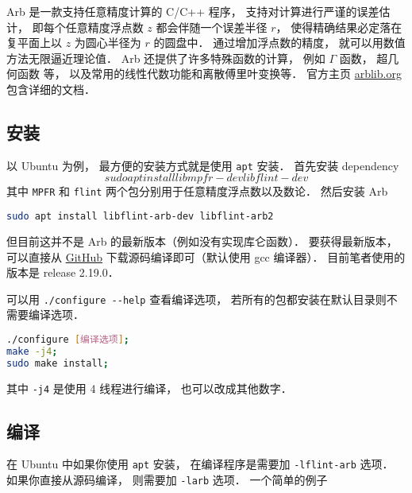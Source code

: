 

Arb 是一款支持任意精度计算的 C/C++ 程序， 支持对计算进行严谨的误差估计， 即每个任意精度浮点数 $z$ 都会伴随一个误差半径 $r$， 使得精确结果必定落在复平面上以 $z$ 为圆心半径为 $r$ 的圆盘中． 通过增加浮点数的精度， 就可以用数值方法无限逼近理论值． Arb 还提供了许多特殊函数的计算， 例如 $\Gamma$ 函数， 超几何函数 等， 以及常用的线性代数功能和离散傅里叶变换等． 官方主页 \href{https://arblib.org/}{arblib.org} 包含详细的文档．

\subsection{安装}
以 Ubuntu 为例， 最方便的安装方式就是使用 \verb|apt| 安装． 首先安装 dependency
\begin{equation}
sudo apt install libmpfr-dev libflint-dev
\end{equation}
其中 \verb|MPFR| 和 \verb|flint| 两个包分别用于任意精度浮点数以及数论． 然后安装 Arb
\begin{lstlisting}[language=bash]
sudo apt install libflint-arb-dev libflint-arb2
\end{lstlisting}

但目前这并不是 Arb 的最新版本（例如没有实现库仑函数）． 要获得最新版本， 可以直接从 \href{https://github.com/fredrik-johansson/arb/}{GitHub} 下载源码编译即可（默认使用 gcc 编译器）． 目前笔者使用的版本是 release 2.19.0．

可以用 \verb|./configure --help| 查看编译选项， 若所有的包都安装在默认目录则不需要编译选项．
\begin{lstlisting}[language=bash]
./configure [编译选项];
make -j4;
sudo make install;
\end{lstlisting}
其中 \verb|-j4| 是使用 4 线程进行编译， 也可以改成其他数字．

\subsection{编译}
在 Ubuntu 中如果你使用 \verb|apt| 安装， 在编译程序是需要加 \verb|-lflint-arb| 选项． 如果你直接从源码编译， 则需要加 \verb|-larb| 选项． 一个简单的例子


